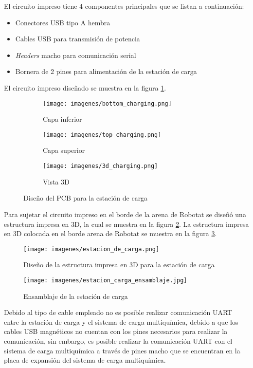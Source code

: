 El circuito impreso tiene 4 componentes principales que se listan a continuación:

\begin{itemize}
    \item Conectores USB tipo A hembra
    \item Cables USB para transmisión de potencia
    \item \textit{Headers} macho para comunicación serial
    \item Bornera de 2 pines para alimentación de la estación de carga
\end{itemize}
El circuito impreso diseñado se muestra en la figura \ref{fig:pcb_estacion_carga}.

\begin{figure}[H]
    \centering
    \begin{subfigure}{0.9\linewidth}
        \centering
        \texttt{[image: imagenes/bottom\_charging.png]}
        \caption{Capa inferior}
    \end{subfigure}
    \vfill
    \begin{subfigure}{0.9\linewidth}
        \centering
        \texttt{[image: imagenes/top\_charging.png]}
        \caption{Capa superior}
    \end{subfigure}
    \vfill
    \begin{subfigure}{0.9\linewidth}
        \centering
        \texttt{[image: imagenes/3d\_charging.png]}
        \caption{Vista 3D}
    \end{subfigure}
    \caption{Diseño del PCB para la estación de carga}
    \label{fig:pcb_estacion_carga}
\end{figure}

Para sujetar el circuito impreso en el borde de la arena de Robotat se diseñó 
una estructura impresa en 3D, la cual se muestra en la figura \ref{fig:3d_estacion_carga}.
La estructura impresa en 3D colocada en el borde arena de Robotat se muestra en la
 figura \ref{fig:estacion_carga_ensamblaje}.

\begin{figure}
    \centering
    \texttt{[image: imagenes/estacion\_de\_carga.png]}
    \caption{Diseño de la estructura impresa en 3D para la estación de carga}
    \label{fig:3d_estacion_carga}
\end{figure}

\begin{figure}[H]
    \centering
    \texttt{[image: imagenes/estacion\_carga\_ensamblaje.jpg]}
    \caption{Ensamblaje de la estación de carga}
    \label{fig:estacion_carga_ensamblaje}
\end{figure}

Debido al tipo de cable empleado no es posible realizar comunicación UART entre
la estación de carga y el sistema de carga multiquímica, debido a que los cables
USB magnéticos no cuentan con los pines necesarios para realizar la comunicación, 
sin embargo, es posible realizar la comunicación UART con el sistema de carga
multiquímica a través de pines macho que se encuentran en la placa de expansión
del sistema de carga multiquímica. 